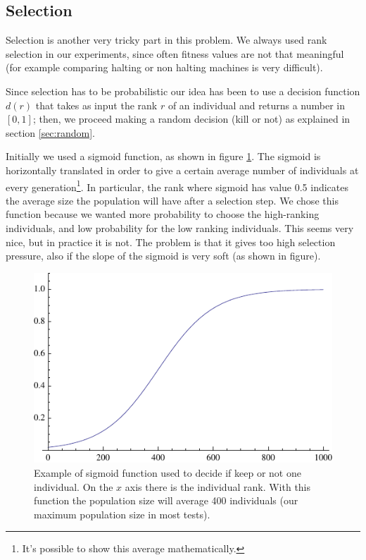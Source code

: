 \documentclass{report}
\begin{document}
\subsection{Selection}
\label{sec:select}


Selection is another very tricky part in this problem. We always used rank selection in our experiments, since often fitness values are not that meaningful (for example comparing halting or non halting machines is very difficult).

Since selection has to be probabilistic our idea has been to use a decision function $d(r)$ that takes as input the rank $r$ of an individual and returns a number in $[0,1]$; then, we proceed making a random decision (kill or not) as explained in section \ref{sec:random}.

Initially we used a sigmoid function, as shown in figure \ref{fig:sigmoid}. The sigmoid is horizontally translated in order to give a certain average number of individuals at every generation\footnote{It's possible to show this average mathematically.}. In particular, the rank where sigmoid has value 0.5 indicates the average size the population will have after a selection step. We chose this function because we wanted more probability to choose the high-ranking individuals, and low probability for the low ranking individuals.
This seems very nice, but in practice it is not. The problem is that it gives too high selection pressure, also if the slope of the sigmoid is very soft (as shown in figure).

\begin{figure}[t]\centering
\includegraphics{figures/decision-function.pdf}
\caption{Example of sigmoid function used to decide if keep or not one individual. On the $x$ axis there is the individual rank. With this function the population size will average 400 individuals (our maximum population size in most tests).}
\label{fig:sigmoid}
\end{figure}
\end{document}

